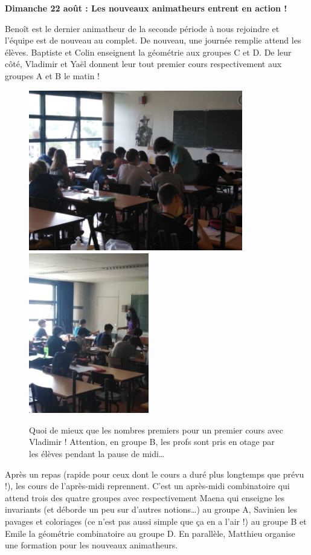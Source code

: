 \begin{center}
{\textbf{Dimanche 22 août : Les nouveaux animatheurs entrent en action !}}
\end{center}
\vspace{2mm}

Benoît est le dernier animatheur de la seconde période à nous rejoindre et l’équipe est de nouveau au complet. De nouveau, une journée remplie attend les élèves. Baptiste et Colin enseignent la géométrie aux groupes C et D. De leur côté, Vladimir et Yaël donnent leur tout premier cours respectivement aux groupes A et B le matin !

\begin{figure}[H]
\centering\includegraphics[height=7cm]{CR-22-0.jpg}\hspace{2cm}\includegraphics[height=7cm]{CR-22-1.jpg}
\caption{Quoi de mieux que les nombres premiers pour un premier cours avec Vladimir ! Attention, en groupe B, les profs sont pris en otage par les élèves pendant la pause de midi…}
\end{figure}

Après un repas (rapide pour ceux dont le cours a duré plus longtemps que prévu !), les cours de l’après-midi reprennent. C’est un après-midi combinatoire qui attend trois des quatre groupes avec respectivement Maena qui enseigne les invariants (et déborde un peu sur d’autres notions…) au groupe A, Savinien les pavages et coloriages (ce n’est pas aussi simple que ça en a l’air !) au groupe B et Emile la géométrie combinatoire au groupe D. En parallèle, Matthieu organise une formation pour les nouveaux animatheurs.

